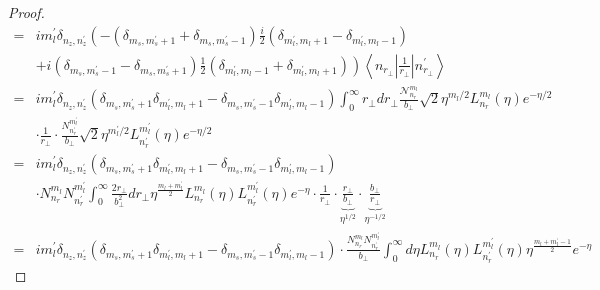 \begin{proof}
\begin{equation}
\begin{aligned}
    =& i m_l^\prime \delta_{n_z,n_z^\prime} \left( -\left( \delta_{m_s,m_s^{\prime}+1} + \delta_{m_s,m_s^{\prime}-1} \right) \frac{i}{2} \left(\delta _{m_{l}^{\prime},m_{l}+1} - \delta_{m_{l}^{\prime},m_{l}-1}\right) \right. \\
    & \left. + i\left(\delta_{m_s,m_s^{\prime}-1} - \delta_{m_s,m_s^{\prime}+1}\right) \frac{1}{2}\left(\delta_{m_{l}^{\prime},m_{l}-1}+\delta_{m_{l}^{\prime},m_{l}+1}\right) \right) \left\langle n_{r_{\perp}} \left| \frac{1}{r_{\perp}} \right| n_{r_\perp}^{\prime} \right\rangle \\
    =& i m_l^\prime \delta_{n_z,n_z^\prime} \left(\delta_{m_s,m_s^{\prime}+1} \delta_{m_{l}^{\prime},m_{l}+1} - \delta_{m_s,m_s^{\prime}-1} \delta_{m_{l}^{\prime},m_{l}-1} \right) \int_{0}^{\infty} r_{\perp} dr_{\perp} \frac{ \mathcal{N}_{n_r}^{m_l} }{ b_{\perp} } \sqrt{2} \eta^{m_l/2} L_{n_r}^{m_l}(\eta) e^{-\eta/2} \\
    &\cdot \frac{1}{r_{\perp}} \cdot \frac{ N_{n_r^{\prime}}^{m_l^{\prime}} }{ b_{\perp} } \sqrt{2} \eta^{m_l^{\prime}/2} L_{n_r^{\prime}}^{m_l^{\prime}}(\eta) e^{-\eta/2} \\
    =& i m_l^\prime \delta_{n_z,n_z^\prime} \left(\delta_{m_s,m_s^{\prime}+1} \delta_{m_{l}^{\prime},m_{l}+1} - \delta_{m_s,m_s^{\prime}-1} \delta_{m_{l}^{\prime},m_{l}-1} \right) \\
    & \cdot N_{n_r}^{m_l} N_{n_r^{\prime}}^{m_l^{\prime}}\int_{0}^{\infty} \frac{2r_{\perp}}{b_{\perp}^2} dr_{\perp} \eta^{\frac{m_l + m_l^\prime}{2}} L_{n_r}^{m_l}(\eta) L_{n_r^\prime}^{m_l^\prime}(\eta)e^{-\eta} \cdot \frac{1}{r_\perp} \cdot  \underbrace{\frac{r_\perp}{b_\perp}}_{\eta^{1/2}} \cdot \underbrace{\frac{b_\perp}{r_\perp}}_{\eta^{-1/2}}\\
    =& i m_l^\prime \delta_{n_z,n_z^\prime} \left(\delta_{m_s,m_s^{\prime}+1} \delta_{m_{l}^{\prime},m_{l}+1} - \delta_{m_s,m_s^{\prime}-1} \delta_{m_{l}^{\prime},m_{l}-1} \right) \cdot \frac{N_{n_r}^{m_l} N_{n_r^{\prime}}^{m_l^{\prime}}}{b_{\perp}} \int_{0}^{\infty} d\eta L_{n_r}^{m_l}(\eta) L_{n_r^\prime}^{m_l^\prime}(\eta) \eta^{\frac{m_l + m_l^\prime - 1}{2}} e^{-\eta}
  \end{aligned}
\end{equation}


\end{proof}
